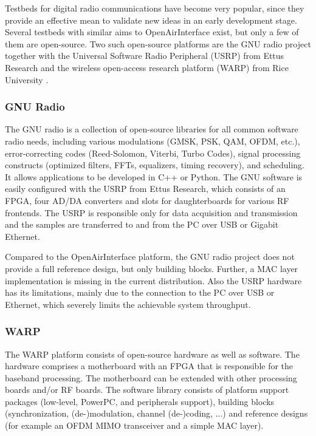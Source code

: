 \documentclass[a4paper,twocolumn,journal]{IEEEtran}
\begin{document}
Testbeds for digital radio communications have become very popular, since they provide an effective mean to validate new ideas in an early development stage. Several testbeds with similar aims to OpenAirInterface exist, but only a few of them are open-source. Two such open-source platforms are the GNU radio project \cite{gnuradio} together with the Universal Software Radio Peripheral (USRP) from Ettus Research \cite{ettus} and the wireless open-access research platform (WARP) from Rice University \cite{warp}.

\subsubsection{GNU Radio}
The GNU radio is a collection of open-source libraries for all common software radio needs, including various modulations (GMSK, PSK, QAM, OFDM, etc.), error-correcting codes (Reed-Solomon, Viterbi, Turbo Codes), signal processing constructs (optimized filters, FFTs, equalizers, timing recovery), and scheduling. It allows applications to be developed in C++ or Python. The GNU software is easily configured with the USRP from Ettus Research, which consists of an FPGA, four AD/DA converters and slots for daughterboards for various RF frontends. The USRP is responsible only for data acquisition and transmission and the samples are transferred to and from the PC over USB or Gigabit Ethernet.

Compared to the OpenAirInterface platform, the GNU radio project does not provide a full reference design, but only building blocks. Further, a MAC layer implementation is missing in the current distribution. Also the USRP hardware has its limitations, mainly due to the connection to the PC over USB or Ethernet, which severely limits the achievable system throughput.

\subsubsection{WARP} 

The WARP platform consists of open-source hardware as well as software. The hardware comprises a motherboard with an FPGA that is responsible for the baseband processing. The motherboard can be extended with other processing boards and/or RF boards. The software library consists of platform support packages (low-level, PowerPC, and peripherals support), building blocks (synchronization, (de-)modulation, channel (de-)coding, ...) and reference designs  (for example an OFDM MIMO transceiver and a simple MAC layer). 
\end{document}
